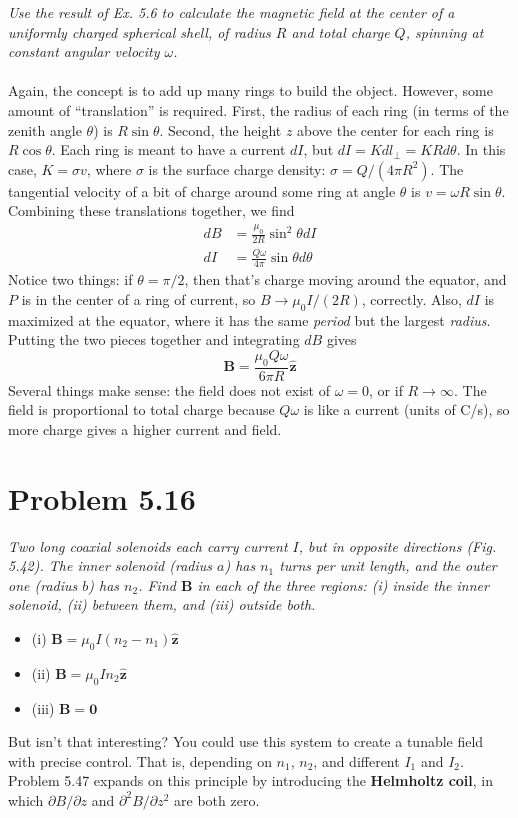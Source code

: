 \documentclass[10pt]{article}
\begin{document}
\textit{Use the result of Ex. 5.6 to calculate the magnetic field at the center of a uniformly charged spherical shell, of radius $R$ and total charge $Q$, spinning at constant angular velocity $\omega$.} \\ \\
Again, the concept is to add up many rings to build the object.  However, some amount of ``translation'' is required.  First, the radius of each ring (in terms of the zenith angle $\theta$) is $R\sin\theta$.  Second, the height $z$ above the center for each ring is $R\cos\theta$.  Each ring is meant to have a current $dI$, but $dI = K dl_{\perp} = K R d\theta$.  In this case, $K = \sigma v$, where $\sigma$ is the surface charge density: $\sigma = Q/(4\pi R^2)$.  The tangential velocity of a bit of charge around some ring at angle $\theta$ is $v = \omega R\sin\theta$.  Combining these translations together, we find
\begin{align}
dB &= \frac{\mu_0}{2R}\sin^2\theta dI \\
dI &= \frac{Q\omega}{4\pi}\sin\theta d\theta
\end{align}
Notice two things: if $\theta = \pi/2$, then that's charge moving around the equator, and $P$ is in the center of a ring of current, so $B \rightarrow \mu_0 I / (2 R)$, correctly.  Also, $dI$ is maximized at the equator, where it has the same \textit{period} but the largest \textit{radius}.  Putting the two pieces together and integrating $dB$ gives
\begin{equation}
\mathbf{B} = \frac{\mu_0 Q \omega}{6\pi R}\hat{\mathbf{z}}
\end{equation}
Several things make sense: the field does not exist of $\omega = 0$, or if $R \to \infty$.  The field is proportional to total charge because $Q\omega$ is like a current (units of C/s), so more charge gives a higher current and field.

\section{Problem 5.16}

\textit{Two long coaxial solenoids each carry current $I$, but in opposite directions (Fig. 5.42).  The inner solenoid (radius $a$) has $n_1$ turns per unit length, and the outer one (radius $b$) has $n_2$.  Find $\mathbf{B}$ in each of the three regions: (i) inside the inner solenoid, (ii) between them, and (iii) outside both.}
\begin{itemize}
\item (i) $\mathbf{B} = \mu_0 I (n_2 - n_1) \hat{\mathbf{z}}$
\item (ii) $\mathbf{B} = \mu_0 I n_2 \hat{\mathbf{z}}$
\item (iii) $\mathbf{B} = \mathbf{0}$
\end{itemize}
But isn't that interesting?  You could use this system to create a tunable field with precise control.  That is, depending on $n_1$, $n_2$, and different $I_1$ and $I_2$.  Problem 5.47 expands on this principle by introducing the \textbf{Helmholtz coil}, in which $\partial B/\partial z$ and $\partial^2 B/\partial z^2$ are both zero.
\end{document}

